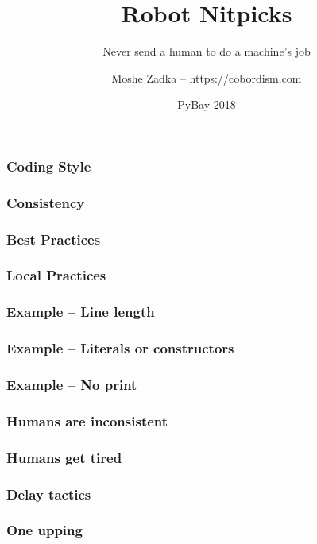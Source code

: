 \usepackage[utf8]{inputenc}
\usepackage{listings}
\usepackage{textcomp}

\title{Robot Nitpicks}
\subtitle{Never send a human to do a machine's job}
\author{Moshe Zadka -- https://cobordism.com}
\date{PyBay 2018}
 

 
\begin{titlepage}
\maketitle
\end{titlepage}

\frame{\titlepage}

\begin{frame}
\frametitle{Coding Style}
\end{frame}

\begin{frame}
\frametitle{Consistency}
\end{frame}

\begin{frame}
\frametitle{Best Practices}
\end{frame}

\begin{frame}
\frametitle{Local Practices}
\end{frame}

\begin{frame}
\frametitle{Example -- Line length}
\end{frame}

\begin{frame}
\frametitle{Example -- Literals or constructors}
\end{frame}

\begin{frame}
\frametitle{Example -- No print}
\end{frame}

\begin{frame}
\frametitle{Humans are inconsistent}
\end{frame}

\begin{frame}
\frametitle{Humans get tired}
\end{frame}

\begin{frame}
\frametitle{Delay tactics}
\end{frame}

\begin{frame}
\frametitle{One upping}
\end{frame}

